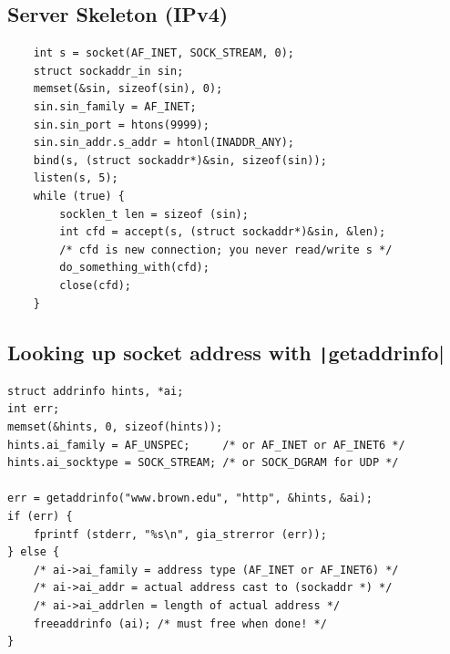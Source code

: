\subsection{Server Skeleton (IPv4)}
\begin{verbatim}
    int s = socket(AF_INET, SOCK_STREAM, 0);
    struct sockaddr_in sin;
    memset(&sin, sizeof(sin), 0);
    sin.sin_family = AF_INET;
    sin.sin_port = htons(9999);
    sin.sin_addr.s_addr = htonl(INADDR_ANY);
    bind(s, (struct sockaddr*)&sin, sizeof(sin));
    listen(s, 5);
    while (true) {
        socklen_t len = sizeof (sin);
        int cfd = accept(s, (struct sockaddr*)&sin, &len);
        /* cfd is new connection; you never read/write s */
        do_something_with(cfd);
        close(cfd);
    }
\end{verbatim}
\subsection{Looking up socket address with \texorpdfstring{\texttt|getaddrinfo|}{getaddrinfo}}
\begin{verbatim}
struct addrinfo hints, *ai;
int err;
memset(&hints, 0, sizeof(hints));
hints.ai_family = AF_UNSPEC;     /* or AF_INET or AF_INET6 */
hints.ai_socktype = SOCK_STREAM; /* or SOCK_DGRAM for UDP */

err = getaddrinfo("www.brown.edu", "http", &hints, &ai);
if (err) {
    fprintf (stderr, "%s\n", gia_strerror (err));
} else {
    /* ai->ai_family = address type (AF_INET or AF_INET6) */
    /* ai->ai_addr = actual address cast to (sockaddr *) */ 
    /* ai->ai_addrlen = length of actual address */ 
    freeaddrinfo (ai); /* must free when done! */
}
\end{verbatim}

